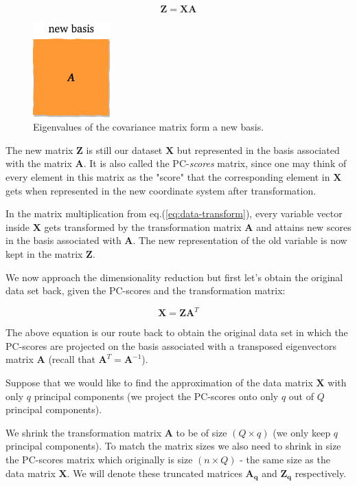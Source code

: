 \documentclass[10pt,twocolumn]{article}
\begin{document}
\begin{equation} \label{eq:data-transform}
\bm{Z} = \bm{X} \bm{A}
\end{equation}

\begin{figure}
\centering\includegraphics[width=3cm]{new-basis.png}
\caption{Eigenvalues of the covariance matrix form a new basis.}
\label{fig:new-basis}
\end{figure}

The new matrix $\bm{Z}$ is still our dataset $\bm{X}$ but represented in the basis associated with the matrix $\bm{A}$. It is also called the PC-\textit{scores} matrix, since one may think of every element in this matrix as the "score" that the corresponding element in $\bm{X}$ gets when represented in the new coordinate system after transformation.

In the matrix multiplication from eq.(\ref{eq:data-transform}), every variable vector inside $\bm{X}$ gets transformed by the transformation matrix $\bm{A}$ and attains new scores in the basis associated with $\bm{A}$. The new representation of the old variable is now kept in the matrix $\bm{Z}$.

We now approach the dimensionality reduction but first let's obtain the original data set back, given the PC-scores and the transformation matrix:

\begin{equation}
\bm{X} = \bm{Z} \bm{A}^T
\end{equation}

The above equation is our route back to obtain the original data set in which the PC-scores are projected on the basis associated with a transposed eigenvectors matrix $\bm{A}$ (recall that $\bm{A}^T = \bm{A}^{-1}$).

Suppose that we would like to find the approximation of the data matrix $\bm{X}$ with only $q$ principal components (we project the PC-scores onto only $q$ out of $Q$ principal components).

We shrink the transformation matrix $\bm{A}$ to be of size $(Q \times q)$ (we only keep $q$ principal components). To match the matrix sizes we also need to shrink in size the PC-scores matrix which originally is size $(n \times Q)$ - the same size as the data matrix $\bm{X}$. We will denote these truncated matrices $\bm{A_q}$ and $\bm{Z_q}$ respectively.
\end{document}

